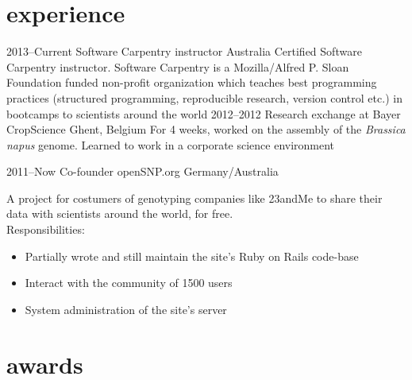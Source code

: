\documentclass[]{friggeri-cv} %
\begin{document}

\section{experience}

\begin{entrylist}
\entry
{2013--Current}
{Software Carpentry instructor}
{Australia}
{Certified Software Carpentry instructor. Software Carpentry is a Mozilla/Alfred P. Sloan Foundation funded non-profit organization which teaches best programming practices (structured programming, reproducible research, version control etc.) in bootcamps to scientists around the world}
\entry
{2012--2012}
{Research exchange {\normalfont at Bayer CropScience}}
{Ghent, Belgium}
{For 4 weeks, worked on the assembly of the \textit{Brassica napus} genome. Learned to work in a corporate science environment}

\entry
{2011--Now}
{Co-founder openSNP.org}
{Germany/Australia}
{A project for costumers of genotyping companies like 23andMe to share their data with scientists around the world, for free.\\
Responsibilities:
\begin{itemize}
\item Partially wrote and still maintain the site's Ruby on Rails code-base
\item Interact with the community of 1500 users
\item System administration of the site's server
\end{itemize}}


\end{entrylist}


\section{awards}
\end{document}
